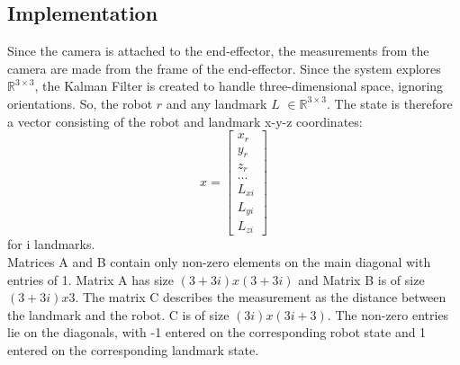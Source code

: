 \subsection*{Implementation}
Since the camera is attached to the end-effector, the measurements from the camera are made from the frame of the end-effector.  Since the system explores $\mathbb{R}^{3\times3}$, the Kalman Filter is created to handle three-dimensional space, ignoring orientations.  So, the robot $r$ and any landmark $L$ $\in\mathbb{R}^{3\times3}$.  The state is therefore a vector consisting of the robot and landmark x-y-z coordinates:
\begin{equation}
    x=\begin{bmatrix} x_r\\y_r\\z_r\\...\\L_{xi}\\L_{yi}\\L_{zi} \end{bmatrix}
\end{equation}
for i landmarks.
\\
Matrices A and B contain only non-zero elements on the main diagonal with entries of 1.  Matrix A has size $(3+3i)x(3+3i)$ and Matrix B is of size $(3+3i)x3$.  The matrix C describes the measurement as the distance between the landmark and the robot.  C is of size $(3i)x(3i+3)$.  The non-zero entries lie on the diagonals, with -1 entered on the corresponding robot state and 1 entered on the corresponding landmark state.
